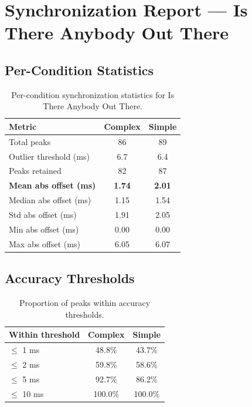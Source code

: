 
\section*{Synchronization Report --- Is There Anybody Out There}

\subsection*{Per-Condition Statistics}

\begin{table}[h!]
\centering
\begin{tabular}{|l|c|c|}
\hline
Metric & Complex & Simple \\
\hline
Total peaks & 86 & 89 \\
Outlier threshold (ms) & 6.7 & 6.4 \\
Peaks retained & 82 & 87 \\
\textbf{Mean abs offset (ms)} & \textbf{1.74} & \textbf{2.01} \\
Median abs offset (ms) & 1.15 & 1.54 \\
Std abs offset (ms) & 1.91 & 2.05 \\
Min abs offset (ms) & 0.00 & 0.00 \\
Max abs offset (ms) & 6.05 & 6.07 \\
\hline
\end{tabular}
\caption{Per-condition synchronization statistics for Is There Anybody Out There.}
\label{tab:sync_stats}
\end{table}

\subsection*{Accuracy Thresholds}

\begin{table}[h!]
\centering
\begin{tabular}{|l|c|c|}
\hline
Within threshold & Complex & Simple \\
\hline
$\leq$ 1 ms & 48.8\% & 43.7\% \\
$\leq$ 2 ms & 59.8\% & 58.6\% \\
$\leq$ 5 ms & 92.7\% & 86.2\% \\
$\leq$ 10 ms & 100.0\% & 100.0\% \\
\hline
\end{tabular}
\caption{Proportion of peaks within accuracy thresholds.}
\label{tab:sync_accuracy}
\end{table}

